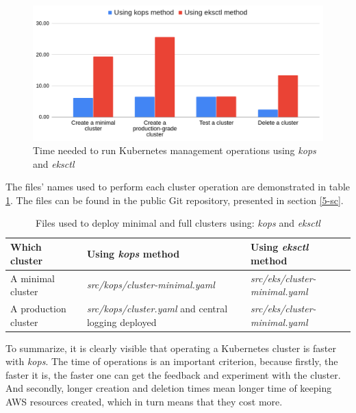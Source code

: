 \begin{figure}[H]
    \centering
    \includegraphics[width=15cm]{figures/k8s-time.png}
    \captionsetup{justification=centering,margin=2cm,width=1.2\linewidth}
    \caption{Time needed to run Kubernetes management operations using \textit{kops} and \textit{eksctl}}
    \label{k8s-time}
\end{figure}


The files' names used to perform each cluster operation are demonstrated in table \ref{tab:comparison-which-file}. The files can be found in the public Git repository, presented in section \ref{5-sc}.
\begin{table}[H]
\captionsetup{justification=centering}
\caption{\label{tab:comparison-which-file}Files used to deploy minimal and full clusters using: \textit{kops} and \textit{eksctl}}
\small
\begin{tabularx}{1\textwidth} {
  | >{\centering\arraybackslash}X
  | >{\centering\arraybackslash}X
  | >{\centering\arraybackslash}X |}
 \hline
  \textbf{Which cluster} & \textbf{Using \textit{kops} method} & \textbf{Using \textit{eksctl} method} \\
 \hline
 A minimal cluster & \textit{src/kops/cluster-minimal.yaml} & \textit{src/eks/cluster-minimal.yaml} \\
 \hline
 A production cluster & \textit{src/kops/cluster.yaml} and central logging deployed & \textit{src/eks/cluster-minimal.yaml} \\
 \hline
\end{tabularx}
\end{table}

To summarize, it is clearly visible that operating a Kubernetes cluster is faster with \textit{kops}. The time of operations is an important criterion, because firstly, the faster it is, the faster one can get the feedback and experiment with the cluster. And secondly, longer creation and deletion times mean longer time of keeping AWS resources created, which in turn means that they cost more.

